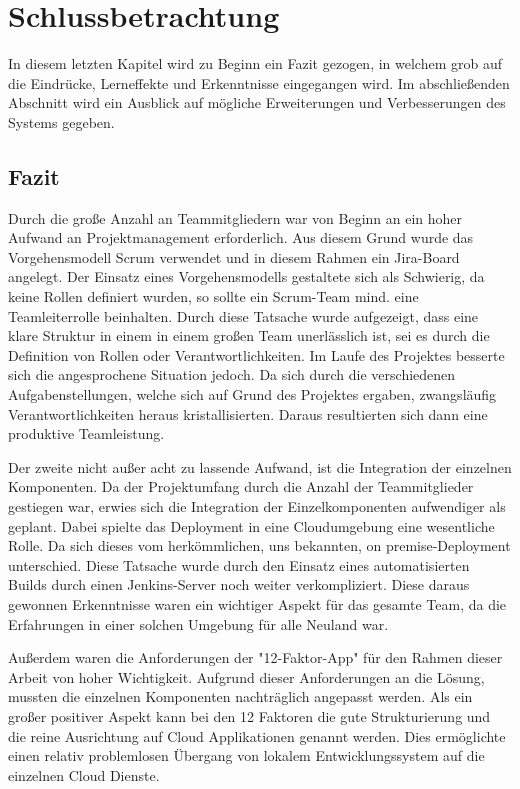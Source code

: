 \section{Schlussbetrachtung}
In diesem letzten Kapitel wird zu Beginn ein Fazit gezogen, in welchem grob auf die Eindrücke, Lerneffekte und Erkenntnisse eingegangen wird. Im abschließenden Abschnitt wird ein Ausblick auf mögliche Erweiterungen und Verbesserungen des Systems gegeben. 
\subsection{Fazit}

Durch die große Anzahl an Teammitgliedern war von Beginn an ein hoher Aufwand an Projektmanagement erforderlich. Aus diesem Grund wurde das Vorgehensmodell Scrum verwendet und in diesem Rahmen ein Jira-Board angelegt. Der Einsatz eines Vorgehensmodells gestaltete sich als Schwierig, da keine Rollen definiert wurden, so sollte ein Scrum-Team mind. eine Teamleiterrolle beinhalten. Durch diese Tatsache wurde aufgezeigt, dass eine klare Struktur in einem in einem großen Team unerlässlich ist, sei es durch die Definition von Rollen oder Verantwortlichkeiten. 
Im Laufe des Projektes besserte sich die angesprochene Situation jedoch. Da sich durch die verschiedenen Aufgabenstellungen, welche sich auf Grund des Projektes ergaben, zwangsläufig Verantwortlichkeiten heraus kristallisierten. 
Daraus resultierten sich dann eine produktive Teamleistung. 

Der zweite nicht außer acht zu lassende Aufwand, ist die Integration der einzelnen Komponenten. 
Da der Projektumfang durch die Anzahl der Teammitglieder gestiegen war, erwies sich die Integration der Einzelkomponenten aufwendiger als geplant. Dabei spielte das Deployment in eine Cloudumgebung eine wesentliche Rolle. Da sich dieses vom herkömmlichen, uns bekannten, on premise-Deployment unterschied. Diese Tatsache wurde durch den Einsatz eines automatisierten Builds durch einen Jenkins-Server noch weiter verkompliziert. 
Diese daraus gewonnen Erkenntnisse waren ein wichtiger Aspekt für das gesamte Team, da die Erfahrungen in einer solchen Umgebung für alle Neuland war. 

Außerdem waren die Anforderungen der "12-Faktor-App" für den Rahmen dieser Arbeit von hoher Wichtigkeit. Aufgrund dieser Anforderungen an die Lösung, mussten die einzelnen Komponenten nachträglich angepasst werden. Als ein großer positiver Aspekt kann bei den 12 Faktoren die gute Strukturierung und die reine Ausrichtung auf Cloud Applikationen genannt werden. Dies ermöglichte einen relativ problemlosen Übergang von lokalem Entwicklungssystem auf die einzelnen Cloud Dienste. 
\clearpage
